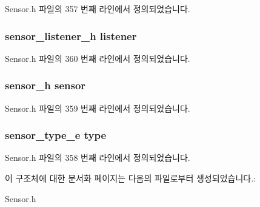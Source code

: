 Sensor.\-h 파일의 357 번째 라인에서 정의되었습니다.

\hypertarget{struct___gyroscope_extend_aa977dfb866b24fd7d9a20a9a01b2fd1f}{
\subsubsection[{listener}]{\setlength{\rightskip}{0pt plus 5cm}sensor\-\_\-listener\-\_\-h listener}}\label{struct___gyroscope_extend_aa977dfb866b24fd7d9a20a9a01b2fd1f}


Sensor.\-h 파일의 360 번째 라인에서 정의되었습니다.

\hypertarget{struct___gyroscope_extend_a5bae9b7801bc3808411925cde81d3f26}{
\subsubsection[{sensor}]{\setlength{\rightskip}{0pt plus 5cm}sensor\-\_\-h sensor}}\label{struct___gyroscope_extend_a5bae9b7801bc3808411925cde81d3f26}


Sensor.\-h 파일의 359 번째 라인에서 정의되었습니다.

\hypertarget{struct___gyroscope_extend_abffb09766da2fc510a79bb51f82a36e1}{
\subsubsection[{type}]{\setlength{\rightskip}{0pt plus 5cm}sensor\-\_\-type\-\_\-e type}}\label{struct___gyroscope_extend_abffb09766da2fc510a79bb51f82a36e1}


Sensor.\-h 파일의 358 번째 라인에서 정의되었습니다.



이 구조체에 대한 문서화 페이지는 다음의 파일로부터 생성되었습니다.\-:\begin{DoxyCompactItemize}
\item 
Sensor.\-h\end{DoxyCompactItemize}
